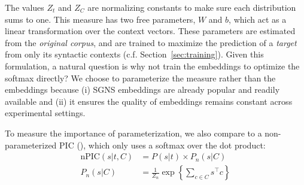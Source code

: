 \documentclass[letterpaper]{article}
\begin{document}
The values $Z_t$ and $Z_C$ are normalizing constants to make sure each
distribution sums to one. This measure has two free parameters, $W$ and $b$,
which act as a linear transformation over the context vectors. These parameters
are estimated from the {\em original corpus}, and are trained to maximize
the prediction of a {\em target} from only its syntactic contexts (c.f. Section~\ref{sec:training}).
Given this formulation, a natural question is why not train the embeddings to optimize the
softmax directly? We choose to parameterize the measure rather than the
embeddings because (i) SGNS embeddings are already popular and readily
available and
(ii) it ensures the quality of embeddings remains constant across experimental 
settings.

To measure the importance of parameterization, we
also compare to a non-parameterized PIC (\ourmeas), which only uses a softmax over the
dot product:
\begin{equation}
  \begin{aligned}
  \mbox{nPIC}(s | t, C) &= P(s | t) \times P_n(s | C)\\
  P_n(s | C) &= \frac{1}{Z_n}\exp\left\{\sum_{c\in C}s^\top c\right\} %
  \end{aligned}
  \label{eqn:npic}
\end{equation}
\end{document}
